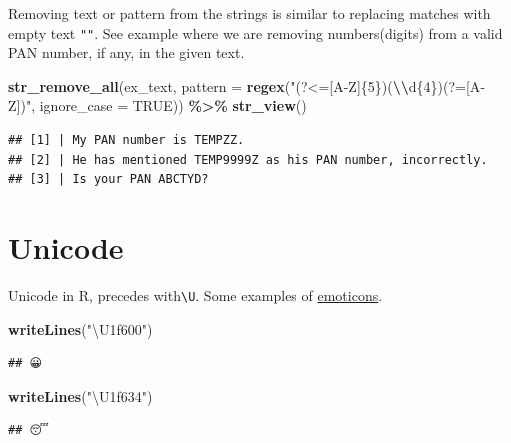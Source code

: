 \documentclass[
]{book}
\newenvironment{Shaded}{\begin{snugshade}}{\end{snugshade}}
\newcommand{\AttributeTok}[1]{\textcolor[rgb]{0.13,0.29,0.53}{#1}}
\newcommand{\ConstantTok}[1]{\textcolor[rgb]{0.56,0.35,0.01}{#1}}
\newcommand{\FunctionTok}[1]{\textcolor[rgb]{0.13,0.29,0.53}{\textbf{#1}}}
\newcommand{\NormalTok}[1]{#1}
\newcommand{\SpecialCharTok}[1]{\textcolor[rgb]{0.81,0.36,0.00}{\textbf{#1}}}
\newcommand{\StringTok}[1]{\textcolor[rgb]{0.31,0.60,0.02}{#1}}
\begin{document}
Removing text or pattern from the strings is similar to replacing matches with empty text \texttt{""}. See example where we are removing numbers(digits) from a valid PAN number, if any, in the given text.

\begin{Shaded}
\begin{Highlighting}[]
\FunctionTok{str\_remove\_all}\NormalTok{(ex\_text,}
               \AttributeTok{pattern =} \FunctionTok{regex}\NormalTok{(}\StringTok{"(?\textless{}=[A{-}Z]\{5\})(}\SpecialCharTok{\textbackslash{}\textbackslash{}}\StringTok{d\{4\})(?=[A{-}Z])"}\NormalTok{, }\AttributeTok{ignore\_case =} \ConstantTok{TRUE}\NormalTok{)) }\SpecialCharTok{\%\textgreater{}\%} 
  \FunctionTok{str\_view}\NormalTok{()}
\end{Highlighting}
\end{Shaded}

\begin{verbatim}
## [1] | My PAN number is TEMPZZ.
## [2] | He has mentioned TEMP9999Z as his PAN number, incorrectly.
## [3] | Is your PAN ABCTYD?
\end{verbatim}

\hypertarget{unicode}{%
\section{Unicode}\label{unicode}}

Unicode in R, precedes with\texttt{\textbackslash{}U}. Some examples of \href{https://en.wikipedia.org/wiki/Emoticons_(Unicode_block)}{emoticons}.

\begin{Shaded}
\begin{Highlighting}[]
\FunctionTok{writeLines}\NormalTok{(}\StringTok{"\textbackslash{}U1f600"}\NormalTok{)}
\end{Highlighting}
\end{Shaded}

\begin{verbatim}
## 😀
\end{verbatim}

\begin{Shaded}
\begin{Highlighting}[]
\FunctionTok{writeLines}\NormalTok{(}\StringTok{"\textbackslash{}U1f634"}\NormalTok{)}
\end{Highlighting}
\end{Shaded}

\begin{verbatim}
## 😴
\end{verbatim}
\end{document}
